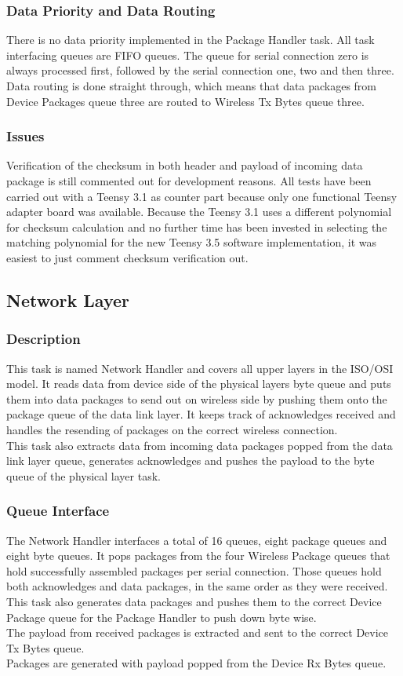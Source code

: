\subsubsection{Data Priority and Data Routing}
There is no data priority implemented in the Package Handler task. All task interfacing queues are FIFO queues. The queue for serial connection zero is always processed first, followed by the serial connection one, two and then three.\\
Data routing is done straight through, which means that data packages from Device Packages queue three are routed to Wireless Tx Bytes queue three.
\subsubsection{Issues}
Verification of the checksum in both header and payload of incoming data package is still commented out for development reasons. All tests have been carried out with a Teensy 3.1 as counter part because only one functional Teensy adapter board was available. Because the Teensy 3.1 uses a different polynomial for checksum calculation and no further time has been invested in selecting the matching polynomial for the new Teensy 3.5 software implementation, it was easiest to just comment checksum verification out.\\
%
%
\subsection{Network Layer}
\subsubsection{Description}
This task is named Network Handler and covers all upper layers in the ISO/OSI model. It reads data from device side of the physical layers byte queue and puts them into data packages to send out on wireless side by pushing them onto the package queue of the data link layer. It keeps track of acknowledges received and handles the resending of packages on the correct wireless connection.\\
This task also extracts data from incoming data packages popped from the data link layer queue, generates acknowledges and pushes the payload to the byte queue of the physical layer task.
\subsubsection{Queue Interface}
The Network Handler interfaces a total of 16 queues, eight package queues and eight byte queues. It pops packages from the four Wireless Package queues that hold successfully assembled packages per serial connection. Those queues hold both acknowledges and data packages, in the same order as they were received.\\
This task also generates data packages and pushes them to the correct Device Package queue for the Package Handler to push down byte wise.\\
The payload from received packages is extracted and sent to the correct Device Tx Bytes queue.\\
Packages are generated with payload popped from the Device Rx Bytes queue.
